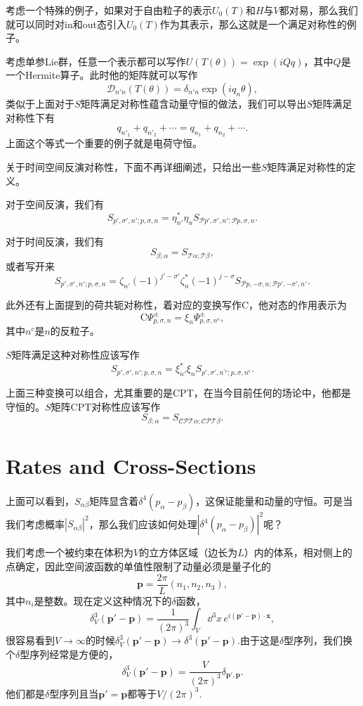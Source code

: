 \documentclass[9pt]{extbook}
\begin{document}
考虑一个特殊的例子，如果对于自由粒子的表示$U_0(T)$和$H$与$V$都对易，那么我们就可以同时对in和out态引入$U_0(T)$作为其表示，那么这就是一个满足对称性的例子。

考虑单参Lie群，任意一个表示都可以写作$U(T(\theta))=\exp(iQq)$，其中$Q$是一个Hermite算子。此时他的矩阵就可以写作
\[
	\mathcal{D}_{n'n}(T(\theta))=\delta_{n'n}\exp(iq_n\theta),
\]
类似于上面对于$S$矩阵满足对称性蕴含动量守恒的做法，我们可以导出$S$矩阵满足对称性下有
\[
	q_{n'_1}+q_{n'_2}+\cdots=q_{n_1}+q_{n_2}+\cdots.
\]
上面这个等式一个重要的例子就是电荷守恒。

关于时间空间反演对称性，下面不再详细阐述，只给出一些$S$矩阵满足对称性的定义。

对于空间反演，我们有
\[
	S_{p',\sigma',n';p,\sigma,n}=\eta^*_{n'}\eta_{n}S_{\mathscr{P}p',\sigma',n';\mathscr{P}p,\sigma,n}.
\]

对于时间反演，我们有
\[
	S_{\beta;\alpha}=S_{\mathscr{T}\alpha;\mathscr{T}\beta},
\]
或者写开来
\[
	S_{p',\sigma',n';p,\sigma,n}=\zeta_{n'}(-1)^{j'-\sigma'}\zeta^*_{n}(-1)^{j-\sigma}S_{\mathscr{P}p,-\sigma,n;\mathscr{P}p',-\sigma',n'}.
\]

此外还有上面提到的荷共轭对称性，着对应的变换写作$\mathrm{C}$，他对态的作用表示为
\[
	\mathrm{C}\Psi^{\pm}_{p,\sigma,n}=\xi_n\Psi^{\pm}_{p,\sigma,n^c},
\]
其中$n^c$是$n$的反粒子。

$S$矩阵满足这种对称性应该写作
\[
	S_{p',\sigma',n';p,\sigma,n}=\xi^*_{n'}\xi_nS_{p',\sigma',n^{\prime c};p,\sigma,n^c}.
\]

上面三种变换可以组合，尤其重要的是CPT，在当今目前任何的场论中，他都是守恒的。$S$矩阵CPT对称性应该写作
\[
	S_{\beta;\alpha}=S_{\mathscr{CPT}\alpha;\mathscr{CPT}\beta}.
\]
\section{Rates and Cross-Sections}
上面可以看到，$S_{\alpha\beta}$矩阵显含着$\delta^4(p_\alpha-p_\beta)$，这保证能量和动量的守恒。可是当我们考虑概率$|S_{\alpha\beta}|^2$，那么我们应该如何处理$|\delta^4(p_\alpha-p_\beta)|^2$呢？


我们考虑一个被约束在体积为$V$的立方体区域（边长为$L
$）内的体系，相对侧上的点确定，因此空间波函数的单值性限制了动量必须是量子化的
\[
	\bm{p}=\frac{2\pi}{L}(n_1,n_2,n_3),
\]
其中$n_i$是整数。现在定义这种情况下的$\delta$函数，
\[
	\delta^3_V(\bm{p}'-\bm{p})=\frac{1}{(2\pi)^3}\int_V \dd^3 x \,e^{i(\bm{p}'-\bm{p})\cdot \bm{x}},
\]
很容易看到$V\to \infty$的时候$\delta^3_V(\bm{p}'-\bm{p})\to \delta^3(\bm{p}'-\bm{p})$.由于这是$\delta$型序列，我们换个$\delta$型序列经常是方便的，
\[
	\delta^3_V(\bm{p}'-\bm{p})=\frac{V}{(2\pi)^3}\delta_{\bm{p}',\bm{p}}.
\]
他们都是$\delta$型序列且当$\bm{p}'=\bm{p}$都等于$V/(2\pi)^3$.
\end{document}
